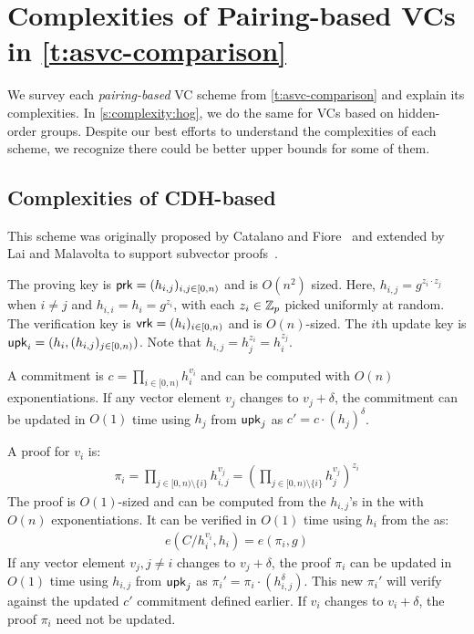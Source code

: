 \section{Complexities of Pairing-based VCs in \cref{t:asvc-comparison}}
\label{s:complexity:kog}

We survey each \textit{pairing-based} VC scheme from \cref{t:asvc-comparison} and explain its complexities.
In \cref{s:complexity:hog}, we do the same for VCs based on hidden-order groups.
Despite our best efforts to understand the complexities of each scheme, we recognize there could be better upper bounds for some of them.

\subsection{Complexities of CDH-based~\cite{LM19}}

This scheme was originally proposed by Catalano and Fiore~\cite{CF13} and extended by Lai and Malavolta to support subvector proofs~\cite{LM19}.

The proving key is $\mathsf{prk}=(h_{i,j})_{i,j\in [0,n)}$ and is $O(n^2)$ sized.
Here, $h_{i,j}=g^{z_i \cdot z_j}$ when $i\ne j$ and $h_{i,i} = h_i=g^{z_i}$, with each $z_i \in \mathbb{Z}_p$ picked uniformly at random.
The verification key is $\mathsf{vrk}=(h_i)_{i\in [0,n)}$ and is $O(n)$-sized.
The $i$th update key is $\mathsf{upk}_i = (h_i, (h_{i,j})_{j\in [0,n)})$.
Note that $h_{i,j} = h_j^{z_i} = h_i^{z_j}$.

A commitment is $c=\prod_{i\in [0,n)} h_i^{v_i}$ and can be computed with $O(n)$ exponentiations.
If any vector element $v_j$ changes to $v_j + \delta$, the commitment can be updated in $O(1)$ time using $h_j$ from $\mathsf{upk}_j$ as $c' = c \cdot (h_j)^{\delta}$.

A proof for $v_i$ is:
\begin{align}
\pi_i = \prod_{j\in [0,n)\setminus\{i\}} h_{i,j}^{v_j}=\left(\prod_{j\in [0,n)\setminus\{i\}} h_{j}^{v_j}\right)^{z_i}
\end{align}
The proof is $O(1)$-sized and can be computed from the $h_{i,j}$'s in the \prk with $O(n)$ exponentiations.
It can be verified in $O(1)$ time using $h_i$ from the \vrk as:
\begin{align}
e(C/h_i^{v_i}, h_i) = e(\pi_i, g)
\end{align}
If any vector element $v_j,j\ne i$ changes to $v_j + \delta$, the proof $\pi_i$ can be updated in $O(1)$ time using $h_{i,j}$ from $\mathsf{upk}_j$ as $\pi_i' = \pi_i \cdot \left(h_{i,j}^{\delta}\right)$.
This new $\pi_i'$ will verify against the updated $c'$ commitment defined earlier.
If $v_i$ changes to $v_i + \delta$, the proof $\pi_i$ need not be updated.

